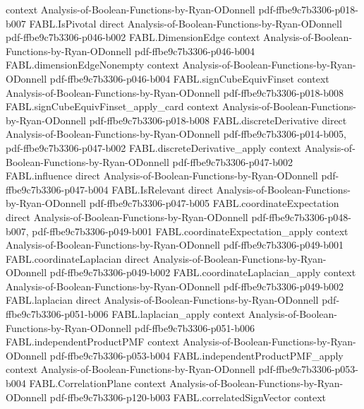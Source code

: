 \begin{theorem}
  {context}
  {Analysis-of-Boolean-Functions-by-Ryan-ODonnell}
  {pdf-ffbe9c7b3306-p018-b007}
\proofstep
  {FABL.IsPivotal}
  {direct}
  {Analysis-of-Boolean-Functions-by-Ryan-ODonnell}
  {pdf-ffbe9c7b3306-p046-b002}
\proofstep
  {FABL.DimensionEdge}
  {context}
  {Analysis-of-Boolean-Functions-by-Ryan-ODonnell}
  {pdf-ffbe9c7b3306-p046-b004}
\proofstep
  {FABL.dimensionEdgeNonempty}
  {context}
  {Analysis-of-Boolean-Functions-by-Ryan-ODonnell}
  {pdf-ffbe9c7b3306-p046-b004}
\proofstep
  {FABL.signCubeEquivFinset}
  {context}
  {Analysis-of-Boolean-Functions-by-Ryan-ODonnell}
  {pdf-ffbe9c7b3306-p018-b008}
\proofstep
  {FABL.signCubeEquivFinset_apply_card}
  {context}
  {Analysis-of-Boolean-Functions-by-Ryan-ODonnell}
  {pdf-ffbe9c7b3306-p018-b008}
\proofstep
  {FABL.discreteDerivative}
  {direct}
  {Analysis-of-Boolean-Functions-by-Ryan-ODonnell}
  {pdf-ffbe9c7b3306-p014-b005,
    pdf-ffbe9c7b3306-p047-b002}
\proofstep
  {FABL.discreteDerivative_apply}
  {context}
  {Analysis-of-Boolean-Functions-by-Ryan-ODonnell}
  {pdf-ffbe9c7b3306-p047-b002}
\proofstep
  {FABL.influence}
  {direct}
  {Analysis-of-Boolean-Functions-by-Ryan-ODonnell}
  {pdf-ffbe9c7b3306-p047-b004}
\proofstep
  {FABL.IsRelevant}
  {direct}
  {Analysis-of-Boolean-Functions-by-Ryan-ODonnell}
  {pdf-ffbe9c7b3306-p047-b005}
\proofstep
  {FABL.coordinateExpectation}
  {direct}
  {Analysis-of-Boolean-Functions-by-Ryan-ODonnell}
  {pdf-ffbe9c7b3306-p048-b007,
    pdf-ffbe9c7b3306-p049-b001}
\proofstep
  {FABL.coordinateExpectation_apply}
  {context}
  {Analysis-of-Boolean-Functions-by-Ryan-ODonnell}
  {pdf-ffbe9c7b3306-p049-b001}
\proofstep
  {FABL.coordinateLaplacian}
  {direct}
  {Analysis-of-Boolean-Functions-by-Ryan-ODonnell}
  {pdf-ffbe9c7b3306-p049-b002}
\proofstep
  {FABL.coordinateLaplacian_apply}
  {context}
  {Analysis-of-Boolean-Functions-by-Ryan-ODonnell}
  {pdf-ffbe9c7b3306-p049-b002}
\proofstep
  {FABL.laplacian}
  {direct}
  {Analysis-of-Boolean-Functions-by-Ryan-ODonnell}
  {pdf-ffbe9c7b3306-p051-b006}
\proofstep
  {FABL.laplacian_apply}
  {context}
  {Analysis-of-Boolean-Functions-by-Ryan-ODonnell}
  {pdf-ffbe9c7b3306-p051-b006}
\proofstep
  {FABL.independentProductPMF}
  {context}
  {Analysis-of-Boolean-Functions-by-Ryan-ODonnell}
  {pdf-ffbe9c7b3306-p053-b004}
\proofstep
  {FABL.independentProductPMF_apply}
  {context}
  {Analysis-of-Boolean-Functions-by-Ryan-ODonnell}
  {pdf-ffbe9c7b3306-p053-b004}
\proofstep
  {FABL.CorrelationPlane}
  {context}
  {Analysis-of-Boolean-Functions-by-Ryan-ODonnell}
  {pdf-ffbe9c7b3306-p120-b003}
\proofstep
  {FABL.correlatedSignVector}
  {context}

\end{theorem}
